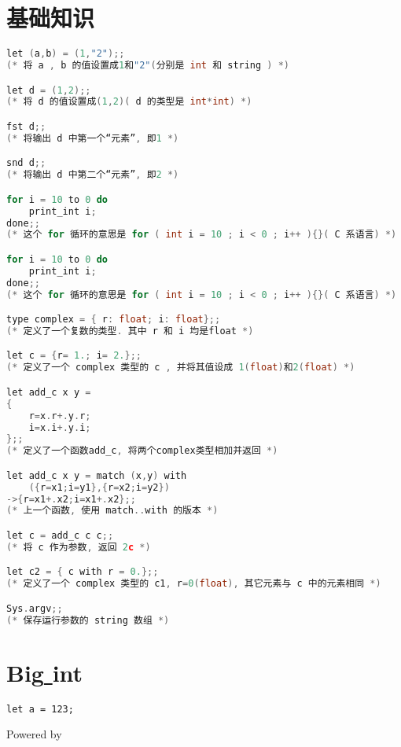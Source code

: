 \documentclass[UTF8,twocolumn]{ctexart}
\begin{document}
\section{基础知识}
\begin{lstlisting}[language=C++]
let (a,b) = (1,"2");;
(* 将 a , b 的值设置成1和"2"(分别是 int 和 string ) *)

let d = (1,2);;
(* 将 d 的值设置成(1,2)( d 的类型是 int*int) *)

fst d;;
(* 将输出 d 中第一个“元素”, 即1 *)

snd d;;
(* 将输出 d 中第二个“元素”, 即2 *)

for i = 10 to 0 do
	print_int i;
done;;
(* 这个 for 循环的意思是 for ( int i = 10 ; i < 0 ; i++ ){}( C 系语言) *)

for i = 10 to 0 do
	print_int i;
done;;
(* 这个 for 循环的意思是 for ( int i = 10 ; i < 0 ; i++ ){}( C 系语言) *)

type complex = { r: float; i: float};;
(* 定义了一个复数的类型. 其中 r 和 i 均是float *)

let c = {r= 1.; i= 2.};;
(* 定义了一个 complex 类型的 c , 并将其值设成 1(float)和2(float) *)

let add_c x y =
{
	r=x.r+.y.r;
	i=x.i+.y.i;
};;
(* 定义了一个函数add_c, 将两个complex类型相加并返回 *)

let add_c x y = match (x,y) with
	({r=x1;i=y1},{r=x2;i=y2})
->{r=x1+.x2;i=x1+.x2};;
(* 上一个函数, 使用 match..with 的版本 *)

let c = add_c c c;;
(* 将 c 作为参数, 返回 2c *)

let c2 = { c with r = 0.};;
(* 定义了一个 complex 类型的 c1, r=0(float), 其它元素与 c 中的元素相同 *)

Sys.argv;;
(* 保存运行参数的 string 数组 *)
\end{lstlisting}
\section{Big\underline{ }int}
\begin{lstlisting}[language=CAML]
let a = 123;
\end{lstlisting}
Powered by \XeLaTeX{}
\end{document}
